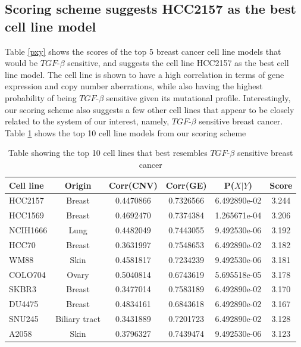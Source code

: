 \documentclass[a4paper,12pt]{article}
\begin{document}
\subsection{Scoring scheme suggests HCC2157 as the best cell line model}
Table \ref{pxy} shows the scores of the top 5 breast cancer cell line
models that would be $\textit{TGF}$-$\beta$ sensitive, and suggests
the cell line HCC2157 as the best cell line model. The cell line is
shown to have a high correlation in terms of gene expression and copy
number aberrations, while also having the highest probability of being
$\textit{TGF}$-$\beta$ sensitive given its mutational profile.
Interestingly, our scoring scheme also suggests a few other cell lines
that appear to be closely related to the system of our interest,
namely, $\textit{TGF}$-$\beta$ sensitive breast cancer. Table \ref{top10} shows the top 10 cell line models from our scoring scheme
\begin{table}
\caption[Table showing scores of top 10 cell lines ]{Table showing the
top 10 cell lines that best resembles $\textit{TGF}$-$\beta$ sensitive
breast cancer}
\label{top10}
\begin{tabular}{l  c c  c  c c}
\hline
Cell line & Origin & Corr(CNV) & Corr(GE) &
P($\textit{X}$$\mid$$\textit{Y}$) & Score \\
\hline
HCC2157 & Breast & 0.4470866 & 0.7326566 & 6.492890e-02 & 3.244\\
HCC1569 & Breast & 0.4692470 & 0.7374384 & 1.265671e-04 & 3.206\\
NCIH1666& Lung & 0.4482049 & 0.7443055 & 9.492530e-06 & 3.192\\
HCC70   & Breast & 0.3631997 & 0.7548653 & 6.492890e-02 & 3.182\\
WM88    & Skin & 0.4581817 & 0.7234239 & 9.492530e-06 & 3.181\\
COLO704 & Ovary & 0.5040814 & 0.6743619 & 5.695518e-05 & 3.178\\
SKBR3   & Breast & 0.3477014 & 0.7583189 & 6.492890e-02 & 3.170\\
DU4475  & Breast & 0.4834161 & 0.6843618 & 6.492890e-02 & 3.167\\
SNU245  & Biliary tract & 0.3431889 & 0.7201723 & 6.492890e-02 & 3.128\\
A2058   & Skin & 0.3796327 & 0.7439474 & 9.492530e-06 & 3.123\\
\hline
\end{tabular}
\end{table}
\end{document}
